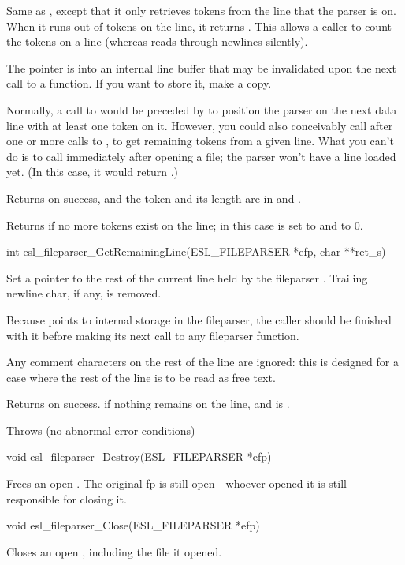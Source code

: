 \begin{sreapi}
Same as , except that it only
retrieves tokens from the line that the parser is
on. When it runs out of tokens on the line, it returns
. This allows a caller to count the tokens on a
line (whereas  reads through newlines
silently).

The  pointer is into an internal line buffer
that may be invalidated upon the next call to a
 function. If you want to store it, make a
copy.

Normally, a call to 
would be preceded by  to
position the parser on the next data line with at least
one token on it. However, you could also conceivably
call  after one or more
calls to , to get remaining
tokens from a given line. What you can't do is to call
 immediately after 
opening a file; the parser won't have a line loaded yet.
(In this case, it would return .)

Returns  on success, and the token and its length are
in  and .

Returns  if no more tokens exist on the line;
in this case  is set to  and 
to 0.


\hypertarget{func:esl_fileparser_GetRemainingLine()}
{\item[int esl\_fileparser\_GetRemainingLine(ESL\_FILEPARSER *efp, char **ret\_s)]}

Set a pointer  to the rest of the current line
held by the fileparser . Trailing newline char,
if any, is removed.

Because  points to internal storage in the
fileparser, the caller should be finished with it before
making its next call to any fileparser function.

Any comment characters on the rest of the line are
ignored: this is designed for a case where the rest of
the line is to be read as free text.

Returns  on success.
 if nothing remains on the line, and 
is .

Throws (no abnormal error conditions)


\hypertarget{func:esl_fileparser_Destroy()}
{\item[void esl\_fileparser\_Destroy(ESL\_FILEPARSER *efp)]}

Frees an open . The original fp is
still open - whoever opened it is still
responsible for closing it.



\hypertarget{func:esl_fileparser_Close()}
{\item[void esl\_fileparser\_Close(ESL\_FILEPARSER *efp)]}

Closes an open , including the 
file it opened. 


\end{sreapi}

